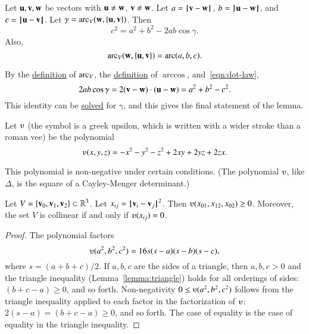 \begin{lemma}\label{lemma:loc}
Let ${\mathbf u},{\mathbf v},{\mathbf w}$ be vectors with ${\mathbf u}\ne {\mathbf w}$, ${\mathbf v}\ne {\mathbf w}$.  Let $a
    = {\hskip0.1em|\hskip-0.15em|\hskip0.1em}{\mathbf v}  -  {\mathbf w}{\hskip0.1em|\hskip-0.15em|\hskip0.1em}$, $b = {\hskip0.1em|\hskip-0.15em|\hskip0.1em}{\mathbf u}  -  {\mathbf w}{\hskip0.1em|\hskip-0.15em|\hskip0.1em}$, and $c = {\hskip0.1em|\hskip-0.15em|\hskip0.1em}{\mathbf u}  -  {\mathbf v}{\hskip0.1em|\hskip-0.15em|\hskip0.1em}$.
    Let $\gamma=\operatorname{arc}_V({\mathbf w},\{{\mathbf u},{\mathbf v}\})$.    Then
        $$c^2 = a^2 + b^2 - 2 a b \cos\gamma.$$
Also,
$$
\operatorname{arc}_V({\mathbf w},\{{\mathbf u},{\mathbf v}\})= \operatorname{arc}(a,b,c).
$$

\end{lemma}
%
%
%
%
\begin{proved}
By the \hyperref[def:angle]{definition} of $\operatorname{arc}_V$, the
\hyperref[def:arccos]{definition} of $\arccos$, and~\eqref{eqn:dot-law},
$$
2 a b \cos \gamma = 2 ({\mathbf v} - {\mathbf w})\cdot ({\mathbf u} - {\mathbf w}) = a^2 + b^2 - c^2.
$$
This identity can be \hyperref[def:arccos]{solved} for $\gamma$, and this gives the final statement of the lemma.
\swallowed\end{proved}


\begin{definition}[$\ups$]\label{def:ups}
Let $\ups$ (the symbol is a greek upsilon, which is written with a
wider stroke than a roman vee) be the polynomial
    $$\ups(x,y,z) = -x^2 - y^2 - z^2 + 2 x y + 2 y z + 2 z x.$$
%
\end{definition}



This polynomial is non-negative under certain conditions. (The polynomial
$\ups$, like $\Delta$, 
is the square of a Cayley-Menger determinant.)  


\begin{lemma}  
Let $V=\{{\mathbf v}_0,{\mathbf v}_1,{\mathbf v}_2\}\subset\mathbb{R}^3$.  Let $x_{ij} = {\hskip0.1em|\hskip-0.15em|\hskip0.1em}{\mathbf v}_i - {\mathbf v}_j{\hskip0.1em|\hskip-0.15em|\hskip0.1em}^2$.
Then $\ups(x_{01},x_{12},x_{02})\ge 0$.  Moreover, the set $V$ is collinear
 if and only if
$\ups(x_{ij}) = 0$.
\end{lemma}

\begin{proof}
The polynomial factors
    $$\ups(a^2,b^2,c^2) = 16 s (s-a) (s-b) (s-c),$$
where $s = (a+b+c)/2$.
If $a,b,c$ are the sides of a triangle, then $a,b,c>0$ and the 
triangle inequality (Lemma~\ref{lemma:triangle}) holds for all orderings of sides: $(b+c-a)\ge 0$, and so forth.
Non-negativity $0\le
\ups(a^2,b^2,c^2)$ follows from the triangle inequality applied to
each factor in the factorization of $\ups$: $2(s-a) = (b+c-a) \ge0$, and
so forth.  The case of equality is the case of equality in the triangle inequality.
%
%
\end{proof}


